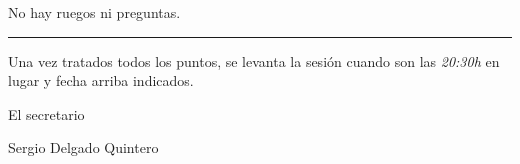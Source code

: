 \documentclass[a4paper, 12pt]{article}
\begin{document}
No hay ruegos ni preguntas.


\vspace{1cm}
\hrule
\vspace{3mm}

Una vez tratados todos los puntos, se levanta la sesión cuando son las \textit{20:30h} en lugar y fecha arriba indicados.

\begin{flushright}
El secretario

Sergio Delgado Quintero
\end{flushright}
\end{document}
